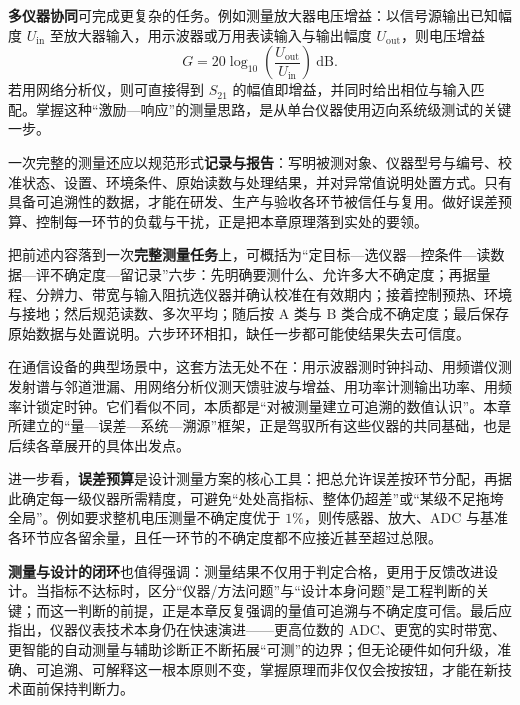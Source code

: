 \textbf{多仪器协同}可完成更复杂的任务。例如测量放大器电压增益：以信号源输出已知幅度 $U_{\mathrm{in}}$ 至放大器输入，用示波器或万用表读输入与输出幅度 $U_{\mathrm{out}}$，则电压增益
\[
    G = 20\log_{10}\!\left(\frac{U_{\mathrm{out}}}{U_{\mathrm{in}}}\right)\ \mathrm{dB}.
\]
若用网络分析仪，则可直接得到 $S_{21}$ 的幅值即增益，并同时给出相位与输入匹配。掌握这种“激励—响应”的测量思路，是从单台仪器使用迈向系统级测试的关键一步。

一次完整的测量还应以规范形式\textbf{记录与报告}：写明被测对象、仪器型号与编号、校准状态、设置、环境条件、原始读数与处理结果，并对异常值说明处置方式。只有具备可追溯性的数据，才能在研发、生产与验收各环节被信任与复用。做好误差预算、控制每一环节的负载与干扰，正是把本章原理落到实处的要领。

把前述内容落到一次\textbf{完整测量任务}上，可概括为“定目标—选仪器—控条件—读数据—评不确定度—留记录”六步：先明确要测什么、允许多大不确定度；再据量程、分辨力、带宽与输入阻抗选仪器并确认校准在有效期内；接着控制预热、环境与接地；然后规范读数、多次平均；随后按 A 类与 B 类合成不确定度；最后保存原始数据与处置说明。六步环环相扣，缺任一步都可能使结果失去可信度。

在通信设备的典型场景中，这套方法无处不在：用示波器测时钟抖动、用频谱仪测发射谱与邻道泄漏、用网络分析仪测天馈驻波与增益、用功率计测输出功率、用频率计锁定时钟。它们看似不同，本质都是“对被测量建立可追溯的数值认识”。本章所建立的“量—误差—系统—溯源”框架，正是驾驭所有这些仪器的共同基础，也是后续各章展开的具体出发点。

进一步看，\textbf{误差预算}是设计测量方案的核心工具：把总允许误差按环节分配，再据此确定每一级仪器所需精度，可避免“处处高指标、整体仍超差”或“某级不足拖垮全局”。例如要求整机电压测量不确定度优于 $1\%$，则传感器、放大、ADC 与基准各环节应各留余量，且任一环节的不确定度都不应接近甚至超过总限。

\textbf{测量与设计的闭环}也值得强调：测量结果不仅用于判定合格，更用于反馈改进设计。当指标不达标时，区分“仪器/方法问题”与“设计本身问题”是工程判断的关键；而这一判断的前提，正是本章反复强调的量值可追溯与不确定度可信。最后应指出，仪器仪表技术本身仍在快速演进——更高位数的 ADC、更宽的实时带宽、更智能的自动测量与辅助诊断正不断拓展“可测”的边界；但无论硬件如何升级，准确、可追溯、可解释这一根本原则不变，掌握原理而非仅仅会按按钮，才能在新技术面前保持判断力。

